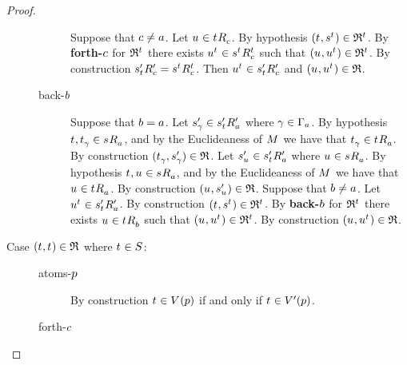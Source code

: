\begin{proof}
\begin{description}
\begin{description}
                Suppose that $c \neq a$.
                Let $\kStateU \in \kSuccessorsC{\kStateT}$.
                By hypothesis $(\kStateT, \kStateS[\kStateT]) \in \refinement^{\kStateT}$.
                By {\bf forth-$c$} for $\refinement^{\kStateT}$ there exists $\kStateU[\kStateT] \in \kSuccessorsC[\kStateT]{\kStateS[\kStateT]}$ such that $(\kStateU, \kStateU[\kStateT]) \in \refinement^{\kStateT}$.
                By construction $\kSuccessorsPC{\kStateSP_{\kStateT}} = \kSuccessorsC[\kStateT]{\kStateS[\kStateT]}$.
                Then $\kStateU[\kStateT] \in \kSuccessorsPC{\kStateSP_{\kStateT}}$ and $(\kStateU, \kStateU[\kStateT]) \in \refinement$.
            \item[back-$b$]
                Suppose that $b = a$.
                Let $\kStateSP_{\gamma} \in \kSuccessorsPA{\kStateSP_{\kStateT}}$ where $\gamma \in \Gamma_a$.
                By hypothesis $\kStateT, \kStateT_{\gamma} \in \kSuccessorsA{\kStateS}$, and by the Euclideaness of $\kModel$ we have that $\kStateT_{\gamma} \in \kSuccessorsA{\kStateT}$.
                By construction $(\kStateT_{\gamma}, \kStateSP_{\gamma}) \in \refinement$.
                Let $\kStateSP_{\kStateU} \in \kSuccessorsPA{\kStateSP_{\kStateT}}$ where $\kStateU \in \kSuccessorsA{\kStateS}$.
                By hypothesis $\kStateT, \kStateU \in \kSuccessorsA{\kStateS}$, and by the Euclideaness of $\kModel$ we have that $\kStateU \in \kSuccessorsA{\kStateT}$.
                By construction $(\kStateU, \kStateSP_{\kStateU}) \in \refinement$.
                Suppose that $b \neq a$.
                Let $\kStateU[\kStateT] \in \kSuccessorsPA{\kStateSP_{\kStateT}}$.
                By construction $(\kStateT, \kStateS[\kStateT]) \in \refinement^{\kStateT}$.
                By {\bf back-$b$} for $\refinement^{\kStateT}$ there exists $\kStateU \in \kSuccessorsB{\kStateT}$ such that $(\kStateU, \kStateU[\kStateT]) \in \refinement^{\kStateT}$.
                By construction $(\kStateU, \kStateU[\kStateT]) \in \refinement$.
        \end{description}
    \item[Case $(\kStateT, \kStateT) \in \refinement$ where $\kStateT \in \kStates$:]
        \hfill
        \begin{description}
            \item[atoms-$p$] 
                By construction $\kStateT \in \kValuation(\atomP)$ if and only if $\kStateT \in \kValuationP(\atomP)$.
            \item[forth-$c$]

\end{description}
\end{description}
\end{proof}
